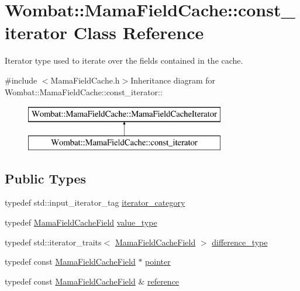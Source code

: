 \hypertarget{classWombat_1_1MamaFieldCache_1_1const__iterator}{
\section{Wombat::MamaFieldCache::const\_\-iterator Class Reference}
\label{classWombat_1_1MamaFieldCache_1_1const__iterator}
}


Iterator type used to iterate over the fields contained in the cache.  


{\ttfamily \#include $<$MamaFieldCache.h$>$}Inheritance diagram for Wombat::MamaFieldCache::const\_\-iterator::\begin{figure}[H]
\begin{center}
\leavevmode
\includegraphics[height=2cm]{classWombat_1_1MamaFieldCache_1_1const__iterator}
\end{center}
\end{figure}
\subsection*{Public Types}
\begin{DoxyCompactItemize}
\item 
typedef std::input\_\-iterator\_\-tag \hyperlink{classWombat_1_1MamaFieldCache_1_1const__iterator_a30252e663d775910e6c1d92d1efc4d68}{iterator\_\-category}
\item 
typedef \hyperlink{classWombat_1_1MamaFieldCacheField}{MamaFieldCacheField} \hyperlink{classWombat_1_1MamaFieldCache_1_1const__iterator_a1f48e05772e82d28bf5f3fdc5e4bef8d}{value\_\-type}
\item 
typedef std::iterator\_\-traits$<$ \hyperlink{classWombat_1_1MamaFieldCacheField}{MamaFieldCacheField} $>$ \hyperlink{classWombat_1_1MamaFieldCache_1_1const__iterator_ae9756a7e7f48a0da504060a0f0ad61c3}{difference\_\-type}
\item 
typedef const \hyperlink{classWombat_1_1MamaFieldCacheField}{MamaFieldCacheField} $\ast$ \hyperlink{classWombat_1_1MamaFieldCache_1_1const__iterator_ad480d553eceafdfab681e2d9f42911bf}{pointer}
\item 
typedef const \hyperlink{classWombat_1_1MamaFieldCacheField}{MamaFieldCacheField} \& \hyperlink{classWombat_1_1MamaFieldCache_1_1const__iterator_ac95fac4180be2db1073f7065248dd7e1}{reference}
\end{DoxyCompactItemize}
